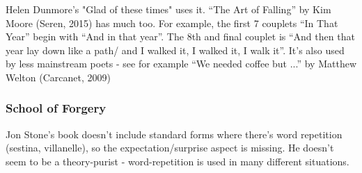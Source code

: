\documentclass[11pt]{article}
\begin{document}
Helen Dunmore's "Glad of these times" uses it. ``The Art of Falling'' by Kim Moore (Seren, 2015) has much too. For example, the first 7 couplets ``In That Year''  begin with ``And in that year''. The 8th and final couplet is ``And then that year lay down like a path/ and I walked it, I walked it, I walk it''. It's also used by less mainstream poets - see for example ``We needed coffee but ...'' by Matthew Welton (Carcanet, 2009)

\subsubsection*{School of Forgery}
Jon Stone's book doesn't include standard forms where there's word repetition (sestina, villanelle), so the expectation/surprise aspect is missing. He doesn't seem to be a theory-purist - word-repetition is used in many different situations.
\end{document}
